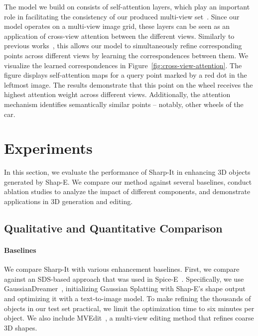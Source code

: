 The model we build on consists of self-attention layers, which play an important role in facilitating the consistency of our produced multi-view set~\cite{shi2024mvdream, wang2023imagedream}. Since our model operates on a multi-view image grid, these layers can be seen as an application of cross-view attention between the different views. Similarly to previous works~\cite{wang2023imagedream, shi2024mvdream, shi2023zero123singleimageconsistent}, this allows our model to simultaneously refine corresponding points across different views by learning the correspondences between them. 
We visualize the learned correspondences in Figure~\ref{fig:cross-view-attention}. The figure displays self-attention maps for a query point marked by a red dot in the leftmost image. The results demonstrate that this point on the wheel receives the highest attention weight across different views. Additionally, the attention mechanism identifies semantically similar points -- notably, other wheels of the car.







\section{Experiments}
In this section, we evaluate the performance of Sharp-It in enhancing 3D objects generated by Shap-E. We compare our method against several baselines, conduct ablation studies to analyze the impact of different components, and demonstrate applications in 3D generation and editing.

\subsection{Qualitative and Quantitative Comparison}


\paragraph{Baselines}

We compare Sharp-It with various enhancement baselines. First, we compare against an SDS-based approach that was used in Spice-E~\cite{sella2024spicee}. Specifically, we use GaussianDreamer~\cite{yi2024gaussiandreamerfastgenerationtext}, initializing Gaussian Splatting with Shap-E's shape output and optimizing it with a text-to-image model. 
To make refining the thousands of objects in our test set practical, we limit the optimization time to six minutes per object.
We also include MVEdit~\cite{mvedit2024}, a multi-view editing method that  refines coarse 3D shapes.


